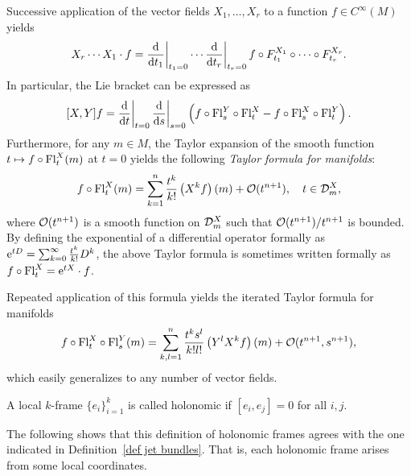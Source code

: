 \begin{rem}\label{rem 3.2.9 RS1}
    Successive application of the vector fields $X_1,\ldots,X_r$ to a function $f\in C^\infty(M)$ yields
    \[X_r\cdots X_1 \cdot f=\restr{\frac{\dd}{\dd t_1}}{t_1=0}\cdots \restr{\frac{\dd}{\dd t_r}}{t_r=0}f\circ F^{X_1}_{t_1}\circ \cdots \circ F^{X_r}_{t_r}.\]
    In particular, the Lie bracket can be expressed as
    \[[X,Y]f=\restr{\frac{\dd}{\dd t}}{t=0}\restr{\frac{\dd}{\dd s}}{s=0}\left(f\circ \Fl^Y_s\circ \Fl^X_t-f\circ \Fl^X_s\circ \Fl^Y_t\right).\label{eq Lie bracket in terms of flows}\]
    Furthermore, for any $m\in M$, the Taylor expansion of the smooth function $t\mapsto f\circ \mathrm{Fl}^X_t(m)$ at $t=0$ yields the following \emph{Taylor formula for manifolds}:
    \[f\circ \mathrm{Fl}^X_t(m)=\sum_{k=1}^n\frac{t^k}{k!}\left(X^kf\right)(m)+\mathcal{O}(t^{n+1}), \quad t\in \mathcal{D}^X_m,\label{eq:Taylor formula for manifolds}\]
    where $\mathcal{O}(t^{n+1})$ is a smooth function on $\mathcal{D}_m^X$ such that $\mathcal{O}(t^{n+1})/t^{n+1}$ is bounded. By defining the exponential of a differential operator formally as $\mathrm{e}^{tD}=\sum_{k=0}^\infty \frac{t^k}{k!}D^k$, the above Taylor formula is sometimes written formally as $f\circ \mathrm{Fl}^X_t=\mathrm{e}^{t X}\cdot f$.

    Repeated application of this formula yields the iterated Taylor formula for manifolds
    \[f\circ \mathrm{Fl}^X_t\circ \mathrm{Fl}^Y_s(m)=\sum_{k,l=1}^n\frac{t^ks^l}{k!l!}\left(Y^lX^kf\right)(m)+\mathcal{O}(t^{n+1},s^{n+1}),\label{eq: Taylor formula for two fields}\]
    which easily generalizes to any number of vector fields.
\end{rem}


\begin{defn}
    A local $k$-frame $\{e_i\}_{i=1}^k$ is called holonomic if $[e_i,e_j]=0$ for all $i,j$.
\end{defn}

The following shows that this definition of holonomic frames agrees with the one indicated in Definition~\ref{def jet bundles}. That is, each holonomic frame arises from some local coordinates.

